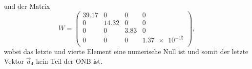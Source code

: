 \begin{enumerate}[label=\alph*)]
    und der Matrix 
    \begin{equation*}
        W = \begin{pmatrix*}
            39.17& 	 0	  &  0	  &  0\\
            0	 &   14.32&	 0	  &  0\\
            0	 &   0	  &  3.83&	 0\\
            0	 &   0	  &  0	  &  \num{1.37e-15}\\
         \end{pmatrix*},
     \end{equation*}
wobei das letzte und vierte Element eine numerische Null ist und somit der letzte Vektor $\vec u_4$ kein Teil der ONB ist.
\end{enumerate}